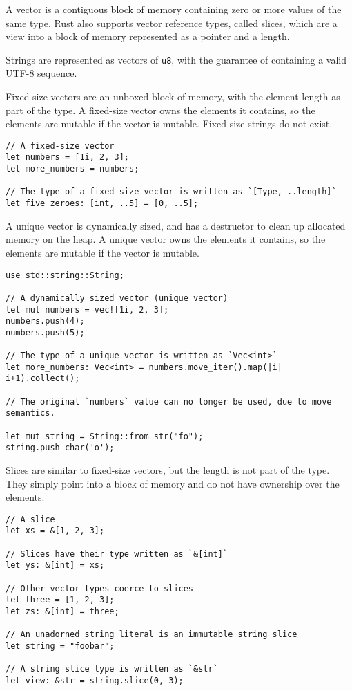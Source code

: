 \documentclass[]{article}
\begin{document}
A vector is a contiguous block of memory containing zero or more values
of the same type. Rust also supports vector reference types, called
slices, which are a view into a block of memory represented as a pointer
and a length.

Strings are represented as vectors of \texttt{u8}, with the guarantee of
containing a valid UTF-8 sequence.

Fixed-size vectors are an unboxed block of memory, with the element
length as part of the type. A fixed-size vector owns the elements it
contains, so the elements are mutable if the vector is mutable.
Fixed-size strings do not exist.

\begin{verbatim}
// A fixed-size vector
let numbers = [1i, 2, 3];
let more_numbers = numbers;

// The type of a fixed-size vector is written as `[Type, ..length]`
let five_zeroes: [int, ..5] = [0, ..5];
\end{verbatim}

A unique vector is dynamically sized, and has a destructor to clean up
allocated memory on the heap. A unique vector owns the elements it
contains, so the elements are mutable if the vector is mutable.

\begin{verbatim}
use std::string::String;

// A dynamically sized vector (unique vector)
let mut numbers = vec![1i, 2, 3];
numbers.push(4);
numbers.push(5);

// The type of a unique vector is written as `Vec<int>`
let more_numbers: Vec<int> = numbers.move_iter().map(|i| i+1).collect();

// The original `numbers` value can no longer be used, due to move semantics.

let mut string = String::from_str("fo");
string.push_char('o');
\end{verbatim}

Slices are similar to fixed-size vectors, but the length is not part of
the type. They simply point into a block of memory and do not have
ownership over the elements.

\begin{verbatim}
// A slice
let xs = &[1, 2, 3];

// Slices have their type written as `&[int]`
let ys: &[int] = xs;

// Other vector types coerce to slices
let three = [1, 2, 3];
let zs: &[int] = three;

// An unadorned string literal is an immutable string slice
let string = "foobar";

// A string slice type is written as `&str`
let view: &str = string.slice(0, 3);
\end{verbatim}
\end{document}
